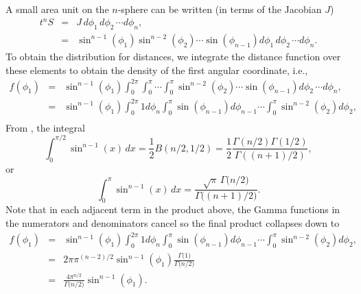 A small area unit on the $n$-sphere can be written (in terms of the
Jacobian $J$)
\begin{eqnarray}
  \label{eq:vn_n_sphere}
  t^nS & = & J \, d\phi_1 \, d\phi_2 \, \cdots d\phi_{n},  \nonumber \\
       & = & \sin^{n-1}(\phi_1) \sin^{n-2}(\phi_2) \cdots \sin(\phi_{n-1})
                  d\phi_1 \, d\phi_2 \, \cdots d\phi_{n}.
\end{eqnarray}
To obtain the distribution for distances, we integrate the distance
function over these elements to obtain the density of the first
angular coordinate, i.e.,
\begin{eqnarray}
  f(\phi_1)
      & = & \sin^{n-1}(\phi_1)
              \int_{0}^{2\pi} \int_{0}^{\pi} \cdots  \int_{0}^{\pi} 
              \sin^{n-2}(\phi_2) \cdots \sin(\phi_{n-1})
                   d\phi_2 \, \cdots d\phi_{n}, \nonumber \\
      & = & \sin^{n-1}(\phi_1)
              \int_{0}^{2\pi} 1 d\phi_{n} 
              \int_{0}^{\pi} \sin(\phi_{n-1}) d\phi_{n-1}  
              \cdots  
              \int_{0}^{\pi} \sin^{n-2}(\phi_2)  d\phi_{2}, \nonumber \\   
\end{eqnarray}
From \cite[3.621,5.(p.369)]{GandR}, the integral
\begin{equation}
  \int_0^{\pi/2} \sin^{n-1}(x) \, dx
     = \frac{1}{2} B\left( n/2, 1/2 \right)
     = \frac{1}{2} \frac{\Gamma(n/2) \Gamma(1/2)}{\Gamma((n+1)/2)},   
\end{equation}
or 
\begin{equation}
  \label{eq:int_sin_n}
  \int_0^{\pi} \sin^{n-1}(x) \, dx = 
       \frac{\sqrt{\pi} \, \Gamma\big( n/2 \big)}{\Gamma\big( (n+1)/2 \big)}.
\end{equation}
Note that in each adjacent term in the product above, the Gamma
functions in the numerators and denominators cancel so the final
product collapses down to
\begin{eqnarray}
  f(\phi_1)
      & = & \sin^{n-1}(\phi_1)
              \int_{0}^{2\pi} 1 d\phi_{n} 
              \int_{0}^{\pi} \sin(\phi_{n-1}) d\phi_{n-1}  
              \cdots  
              \int_{0}^{\pi} \sin^{n-2}(\phi_2)  d\phi_{2}, \nonumber \\   
      & = & 2 \pi \pi^{(n-2)/2} \sin^{n-1}(\phi_1)  
                     \frac{\Gamma\big( 1 \big)}{\Gamma\big( n/2 \big)}
                 \nonumber \\   
      & = &  \frac{4 \pi^{n/2}}{\Gamma\big( n/2 \big)} \sin^{n-1}(\phi_1)  .
\end{eqnarray}
